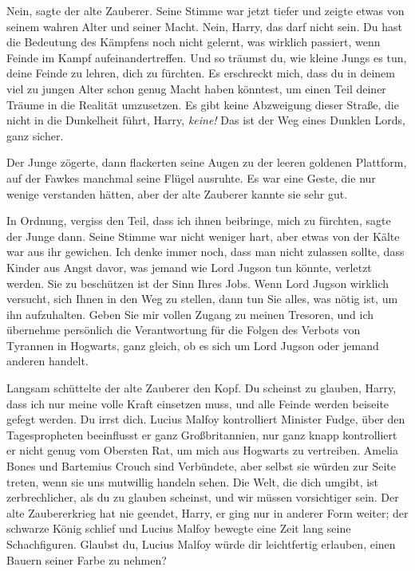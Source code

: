 \glqq Nein\grqq{}, sagte der alte Zauberer. Seine Stimme war jetzt tiefer und
zeigte etwas von seinem wahren Alter und seiner Macht. \glqq Nein, Harry, das
darf nicht sein. Du hast die Bedeutung des Kämpfens noch nicht gelernt, was
wirklich passiert, wenn Feinde im Kampf aufeinandertreffen. Und so träumst du,
wie kleine Jungs es tun, deine Feinde zu lehren, dich zu fürchten. Es erschreckt
mich, dass du in deinem viel zu jungen Alter schon genug Macht haben könntest,
um einen Teil deiner Träume in die Realität umzusetzen. Es gibt keine Abzweigung
dieser Straße, die nicht in die Dunkelheit führt, Harry, \emph{keine!} Das ist
der Weg eines Dunklen Lords, ganz sicher.\grqq{}

Der Junge zögerte, dann flackerten seine Augen zu der leeren goldenen Plattform,
auf der Fawkes manchmal seine Flügel ausruhte. Es war eine Geste, die nur wenige
verstanden hätten, aber der alte Zauberer kannte sie sehr gut.

\glqq In Ordnung, vergiss den Teil, dass ich ihnen beibringe, mich zu
fürchten\grqq{}, sagte der Junge dann. Seine Stimme war nicht weniger hart, aber
etwas von der Kälte war aus ihr gewichen. \glqq Ich denke immer noch, dass man
nicht zulassen sollte, dass Kinder aus Angst davor, was jemand wie Lord Jugson
tun könnte, verletzt werden. Sie zu beschützen ist der Sinn Ihres Jobs. Wenn
Lord Jugson wirklich versucht, sich Ihnen in den Weg zu stellen, dann tun Sie
alles, was nötig ist, um ihn aufzuhalten. Geben Sie mir vollen Zugang zu meinen
Tresoren, und ich übernehme persönlich die Verantwortung für die Folgen des
Verbots von Tyrannen in Hogwarts, ganz gleich, ob es sich um Lord Jugson oder
jemand anderen handelt.\grqq{}

Langsam schüttelte der alte Zauberer den Kopf. \glqq Du scheinst zu glauben,
Harry, dass ich nur meine volle Kraft einsetzen muss, und alle Feinde werden
beiseite gefegt werden. Du irrst dich. Lucius Malfoy kontrolliert Minister
Fudge, über den Tagespropheten beeinflusst er ganz Großbritannien, nur ganz
knapp kontrolliert er nicht genug vom Obersten Rat, um mich aus Hogwarts zu
vertreiben. Amelia Bones und Bartemius Crouch sind Verbündete, aber selbst sie
würden zur Seite treten, wenn sie uns mutwillig handeln sehen. Die Welt, die
dich umgibt, ist zerbrechlicher, als du zu glauben scheinst, und wir müssen
vorsichtiger sein. Der alte Zaubererkrieg hat nie geendet, Harry, er ging nur in
anderer Form weiter; der schwarze König schlief und Lucius Malfoy bewegte eine
Zeit lang seine Schachfiguren. Glaubst du, Lucius Malfoy würde dir leichtfertig
erlauben, einen Bauern seiner Farbe zu nehmen?\grqq{}

